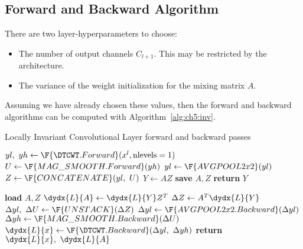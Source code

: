 \subsection{Forward and Backward Algorithm}
There are two layer-hyperparameters to choose:
\begin{itemize}
  \item The number of output channels $C_{l+1}$. This may be restricted by the
    architecture.
  \item The variance of the weight initialization for the mixing matrix $A$.
\end{itemize}

Assuming we have already chosen these values, 
then the forward and backward algorithms can be computed with
Algorithm~\autoref{alg:ch5:inv}.


\begin{algorithm}[tb]
\caption{Locally Invariant Convolutional Layer forward and backward
passes}\label{alg:ch5:inv}
\begin{algorithmic}[1]
\State $yl,\ yh \gets \F{\DTCWT.Forward}(x^l, \mbox{nlevels}=1) $ 
  \State $U \gets \F{MAG\_SMOOTH.Forward}(yh)$ 
  \State $yl \gets \F{AVGPOOL2x2}(yl)$  
  \State $Z \gets \F{CONCATENATE}(yl,\ U)$ 
  \State $Y \gets AZ$ 
  \State \textbf{save} $A, Z$ 
  \State \textbf{return} $Y$ 
\EndProcedure
\end{algorithmic}\vspace{10pt}
\begin{algorithmic}[1]
  \State \textbf{load} $A, Z$
  \State $\dydx{L}{A} \gets \dydx{L}{Y} Z^T$ 
  \State $\Delta{Z} \gets A^T\dydx{L}{Y}$ 
  \State $\Delta yl,\ \Delta U \gets \F{UNSTACK}(\Delta Z)$ 
  \State $\Delta yl \gets \F{AVGPOOL2x2.Backward}(\Delta yl)$
  \State $\Delta yh \gets \F{MAG\_SMOOTH.Backward}(\Delta U)$
  \State $\dydx{L}{x} \gets \F{\DTCWT.Backward}(\Delta yl,\ \Delta yh)$ 
  \State \textbf{return} $\dydx{L}{x},\ \dydx{L}{A}$
\EndProcedure
\end{algorithmic}
\end{algorithm}



